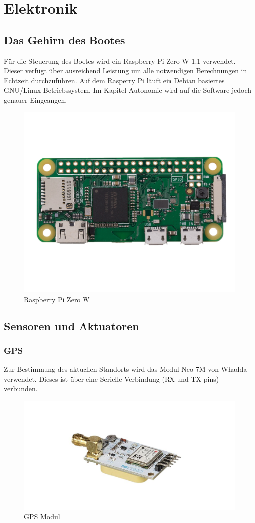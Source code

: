 

\chapter{Elektronik}
\label{chap:elektronik}

\section{Das Gehirn des Bootes}
Für die Steuerung des Bootes wird ein Raspberry Pi Zero W 1.1 verwendet. Dieser verfügt über ausreichend Leistung um alle notwendigen Berechnungen in Echtzeit durchzuführen. Auf dem Rasperry Pi läuft ein Debian basiertes GNU/Linux Betriebssystem. Im Kapitel Autonomie wird auf die Software jedoch genauer Eingeangen.

\begin{figure}
    \centering
    \includegraphics[width=0.5\linewidth]{assets/raspi Zero.jpg}
    \caption{Raspberry Pi Zero W}
    \label{fig:enter-label}
\end{figure}




\section{Sensoren und Aktuatoren}
\subsection{GPS}
Zur Bestimmung des aktuellen Standorts wird das Modul Neo 7M von Whadda verwendet. Dieses ist über eine Serielle Verbindung (RX und TX pins) verbunden.
\begin{figure}[H] 
    \centering
    \includegraphics[width=0.5\linewidth]{gps.png}
    \caption{GPS Modul}
    \label{fig:gps}
\end{figure}

